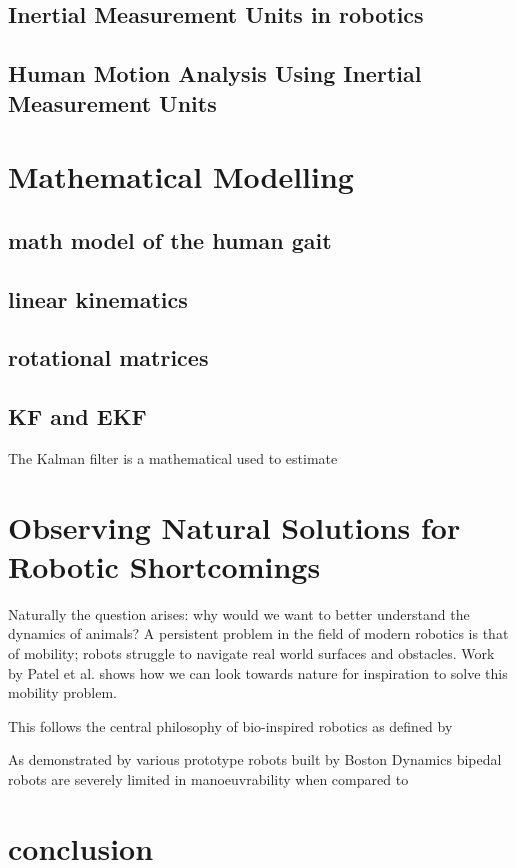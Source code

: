 \subsection{Inertial Measurement Units in robotics}

\subsection{Human Motion Analysis Using Inertial Measurement Units}


\section{Mathematical Modelling}
\subsection{math model of the human gait}
\subsection{linear kinematics}
\subsection{rotational matrices}

\subsection{KF and EKF}
The Kalman filter is a mathematical used to estimate



\section{Observing Natural Solutions for Robotic Shortcomings}
Naturally the question arises:  why would we want to better understand the dynamics of animals? A persistent problem in the field of modern robotics is that of mobility; robots struggle to navigate real world surfaces and obstacles. Work by Patel et al. \cite{patel2013rapid} shows how we can look towards nature for inspiration to solve this mobility problem.

This follows the central philosophy of bio-inspired robotics as defined by 

As demonstrated by various prototype robots built by Boston Dynamics bipedal robots are severely limited in manoeuvrability when compared to   

\section{conclusion}








